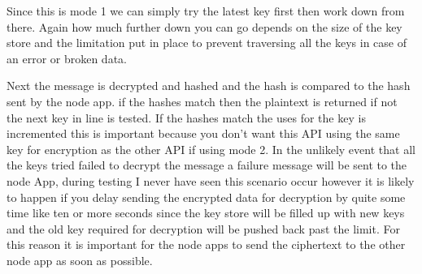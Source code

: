 Since this is mode 1 we can simply try the latest key first then work down from there. Again how much further down you can go depends on the size of the key store and the limitation put in place to prevent traversing all the keys in case of an error or broken data.

Next the message is decrypted and hashed and the hash is compared to the hash sent by the node app. if the hashes match then the plaintext is returned if not the next key in line is tested.
If the hashes match the uses for the key is incremented this is important because you don't want this API using the same key for encryption as the other API if using mode 2. 
In the unlikely event that all the keys tried failed to decrypt the message a failure message will be sent to the node App, during testing I never have seen this scenario occur however it is likely to happen if you delay sending the encrypted data for decryption by quite some time like ten or more seconds since the key store will be filled up with new keys and the old key required for decryption will be pushed back past the limit. For this reason it is important for the node apps to send the ciphertext to the other node app as soon as possible.

